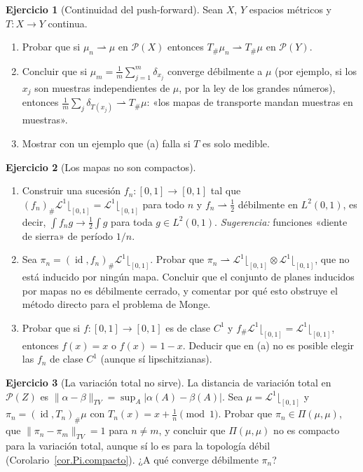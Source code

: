 \documentclass[12pt, a4paper]{amsbook}
\newcommand{\id}{\operatorname{id}}
\newcommand{\LL}{{\mathcal L}}
\theoremstyle{remark}
\theoremstyle{definition}
\newtheorem{ejercicio}{Ejercicio}[chapter]
\numberwithin{section}{chapter}
\numberwithin{subsection}{section}
\numberwithin{equation}{section}
\numberwithin{figure}{chapter}
\begin{document}
\begin{ejercicio}[Continuidad del push-forward]\label{ejer.pushforward.continuo}
Sean $X$, $Y$ espacios métricos y $T\colon X\to Y$ continua.
\begin{enumerate}[label=(\alph*)]
\item Probar que si $\mu_n\rightharpoonup\mu$ en $\mathcal P(X)$ entonces
$T_\#\mu_n\rightharpoonup T_\#\mu$ en $\mathcal P(Y)$.
\item Concluir que si $\mu_m=\frac1m\sum_{j=1}^m\delta_{x_j}$ converge
débilmente a $\mu$ (por ejemplo, si los $x_j$ son muestras independientes de
$\mu$, por la ley de los grandes números), entonces
$\frac1m\sum_j\delta_{T(x_j)}\rightharpoonup T_\#\mu$: «los mapas de
transporte mandan muestras en muestras».
\item Mostrar con un ejemplo que (a) falla si $T$ es solo medible.
\end{enumerate}
\end{ejercicio}

\begin{ejercicio}[Los mapas no son compactos]\label{ejer.mapas.no.compactos}
\leavevmode
\begin{enumerate}[label=(\alph*)]
\item Construir una sucesión $f_n\colon[0,1]\to[0,1]$ tal que
$(f_n)_\#\LL^1\lfloor_{[0,1]}=\LL^1\lfloor_{[0,1]}$ para todo $n$ y
$f_n\rightharpoonup\frac12$ débilmente en $L^2(0,1)$, es decir,
$\int f_n g\to\frac12\int g$ para toda $g\in L^2(0,1)$.
\emph{Sugerencia:} funciones «diente de sierra» de período $1/n$.
\item Sea $\pi_n=(\id,f_n)_\#\LL^1\lfloor_{[0,1]}$. Probar que
$\pi_n\rightharpoonup\LL^1\lfloor_{[0,1]}\otimes\LL^1\lfloor_{[0,1]}$, que no
está inducido por ningún mapa. Concluir que el conjunto de planes inducidos
por mapas no es débilmente cerrado, y comentar por qué esto obstruye el
método directo para el problema de Monge.
\item Probar que si $f\colon[0,1]\to[0,1]$ es de clase $C^1$ y
$f_\#\LL^1\lfloor_{[0,1]}=\LL^1\lfloor_{[0,1]}$, entonces $f(x)=x$ o
$f(x)=1-x$. Deducir que en (a) no es posible elegir las $f_n$ de clase $C^1$
(aunque sí lipschitzianas).
\end{enumerate}
\end{ejercicio}

\begin{ejercicio}[La variación total no sirve]\label{ejer.variacion.total}
La distancia de variación total en $\mathcal P(Z)$ es
$\|\alpha-\beta\|_{TV}=\sup_{A}|\alpha(A)-\beta(A)|$. Sea
$\mu=\LL^1\lfloor_{[0,1]}$ y $\pi_n=(\id,T_n)_\#\mu$ con
$T_n(x)=x+\frac1n \pmod 1$. Probar que $\pi_n\in\Pi(\mu,\mu)$, que
$\|\pi_n-\pi_m\|_{TV}=1$ para $n\ne m$, y concluir que $\Pi(\mu,\mu)$ no es
compacto para la variación total, aunque sí lo es para la topología débil
(Corolario~\ref{cor.Pi.compacto}). ¿A qué converge débilmente $\pi_n$?
\end{ejercicio}
\end{document}
